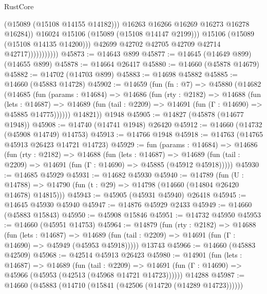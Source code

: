 \begin{lexlean}{RustCore}
\begin{coremodule}
                                    (@15089 (@15108 @14155 @14182)))
                                  @16263
                                  @16266
                                  @16269
                                  @16273
                                  @16278
                                  @16284))
                              @16024
                              @15106
                              (@15089 (@15108 @14147 @2199)))
                            @15106
                            (@15089 (@15108 @14135 @14200)))
                          @42699
                          @42702
                          @42705
                          @42709
                          @42714
                          @42717)))))))))))
@45873 := @14643 @899
@45877 := @14645 (@14649 @899) (@14655 @899)
@45878 := @14664 @26417
@45880 := @14660 (@45878 @14679)
@45882 := @14702 (@14703 @899)
@45883 := @14698 @45882
@45885 := @14660 (@45883 @14728)
@45902 := @14659
    (fun (fn : @7) =>
    @45880
      (@14682
        (@14685
          (fun (params : @14684) =>
          @14686
            (fun (rty : @2182) =>
            @14688
              (fun (lets : @14687) =>
              @14689 (fun (tail : @2209) => @14691 (fun (Γ : @14690) => @45885 @14775))))))
        @14821))
    @1948
@45905 := @14827 (@45878 (@14677 @1948))
@45908 := @14740 (@14741 @1948) @26420
@45912 := @14660 (@14732 (@45908 @14749) @14753)
@45913 := @14766 @1948
@45918 := @14763 (@14765 @45913 @26423 @14721 @14723)
@45929 := fun (params : @14684) =>
  @14686
    (fun (rty : @2182) =>
    @14688
      (fun (lets : @14687) =>
      @14689 (fun (tail : @2209) => @14691 (fun (Γ : @14690) => @45885 (@45912 @45918)))))
@45930 := @14685 @45929
@45931 := @14682 @45930
@45940 := @14789
    (fun (U : @14788) => @14790 (fun (t : @29) => @14798 (@14660 (@14804 @26420 @14678) @14815)))
@45943 := @45905 (@45931 @45940) @26418
@45945 := @14645 @45930 @45940
@45947 := @14876 @45929 @2433
@45949 := @14660 (@45883 @15843)
@45950 := @45908 @15846
@45951 := @14732 @45950
@45953 := @14660 (@45951 @14753)
@45964 := @14879
    (fun (rty : @2182) =>
    @14688
      (fun (lets : @14687) =>
      @14689 (fun (tail : @2209) => @14691 (fun (Γ : @14690) => @45949 (@45953 @45918)))))
    @13743
@45966 := @14660 (@45883 @42509)
@45968 := @42514 @45913 @26423
@45980 := @14901
    (fun (lets : @14687) =>
    @14689
      (fun (tail : @2209) =>
      @14691 (fun (Γ : @14690) => @45966 (@45953 (@42513 (@45968 @14721 @14723))))))
    @14288
@45987 := @14660 (@45883 (@14710 (@15841 (@42506 (@14720 (@14289 @14723))))))

\end{coremodule}
\end{lexlean}
